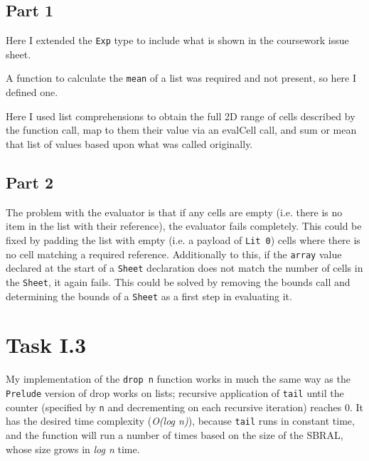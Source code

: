 \documentclass[11pt]{article}
\begin{document}
\subsection{Part 1}


Here I extended the \verb|Exp| type to include what is shown in the coursework issue sheet.



A function to calculate the \verb|mean| of a list was required and not present, so here I defined one.



Here I used list comprehensions to obtain the full 2D range of cells described by the function call, map to them their value via an evalCell call, and sum or mean that list of values based upon what was called originally.

\subsection{Part 2}

The problem with the evaluator is that if any cells are empty (i.e. there is no item in the list with their reference), the evaluator fails completely.
This could be fixed by padding the list with empty (i.e. a payload of \verb|Lit 0|) cells where there is no cell matching a required reference.
Additionally to this, if the \verb|array| value declared at the start of a \verb|Sheet| declaration does not match the number of cells in the \verb|Sheet|, it again fails.
This could be solved by removing the bounds call and determining the bounds of a \verb|Sheet| as a first step in evaluating it.

\section{Task I.3}



My implementation of the \verb|drop n| function works in much the same way as the \verb|Prelude| version of drop works on lists; recursive application of \verb|tail| until the counter (specified by \verb|n| and decrementing on each recursive iteration) reaches 0.
It has the desired time complexity (\textit{O(log n)}), because \verb|tail| runs in constant time, and the function will run a number of times based on the size of the SBRAL, whose size grows in \textit{log n} time.
\end{document}
